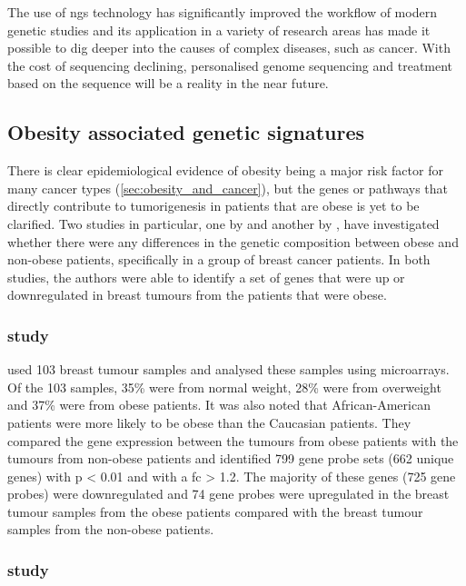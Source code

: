 The use of \gls{ngs} technology has significantly improved the workflow of modern genetic studies and its application in a variety of research areas has made it possible to dig deeper into the causes of complex diseases, such as cancer.
With the cost of sequencing declining, personalised genome sequencing and treatment based on the sequence will be a reality in the near future.

\subsection{Obesity associated genetic signatures}
\label{sub:obesity_associated_genetic_signatures}

There is clear epidemiological evidence of obesity being a major risk factor for many cancer types (\cref{sec:obesity_and_cancer}), but the genes or pathways that directly contribute to tumorigenesis in patients that are obese is yet to be clarified.
Two studies in particular, one by \citet{Creighton2012} and another by \citet{Fuentes-Mattei2014}, have investigated whether there were any differences in the genetic composition between obese and non-obese patients, specifically in a group of breast cancer patients.
In both studies, the authors were able to identify a set of genes that were up or downregulated in breast tumours from the patients that were obese.

\subsubsection{\citet{Creighton2012} study}
\label{ssub:creighton_study}

\citet{Creighton2012} used 103 breast tumour samples and analysed these samples using microarrays.
Of the 103 samples, 35\% were from normal weight, 28\% were from overweight and 37\% were from obese patients.
It was also noted that African-American patients were more likely to be obese than the Caucasian patients.
They compared the gene expression between the tumours from obese patients with the tumours from non-obese patients and identified 799 gene probe sets (662 unique genes) with p \textless{} 0.01 and with a \gls{fc} \textgreater{} 1.2.
The majority of these genes (725 gene probes) were downregulated and 74 gene probes were upregulated in the breast tumour samples from the obese patients compared with the breast tumour samples from the non-obese patients.

\subsubsection{\citet{Fuentes-Mattei2014} study}
\label{ssub:fuentes_mattei_study}

